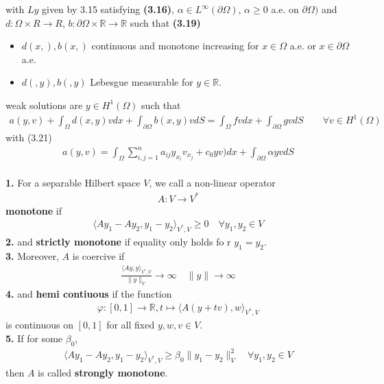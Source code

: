 \documentclass[a4paper,11pt,fleqn]{book}
\theoremstyle{definition}
\theoremstyle{remark}
\begin{document}
with $Ly$ given by 3.15 satisfying\textbf{ (3.16)}, $\alpha \in L^\infty(\partial \Omega)$, $\alpha \geq 0$ a.e. on $\partial \Omega)$ and $d: \Omega \times R \rightarrow R$, $b: \partial \Omega \times \mathbb{R} \rightarrow \mathbb{R}$ such that \textbf{(3.19)}
\begin{itemize}
	\item $d(x, ), b(x, )$ continuous and monotone increasing for $x \in \Omega$ a.e. or $x \in \partial \Omega$ a.e. 
	\item $d(, y), b(,y )$ Lebesgue measurable for $y \in \mathbb{R}$. 
\end{itemize}
weak solutions are $y \in H^1(\Omega)$ such that
\begin{align*}
	a(y, v) + \int_\Omega d(x, y) v dx + \int_{\partial \Omega} b(x, y) v dS 
	= \int_\Omega fv dx + \int_{\partial \Omega} gv dS \qquad \forall v \in H^1(\Omega)
\end{align*}
with (3.21)
\begin{align*}
	a(y, v) = \int_{\Omega} \sum_{i, j = 1}^n a_{ij} y_{x_i} v_{x_j} + c_0yv)dx + \int_{\partial \Omega} \alpha y v dS
\end{align*}
\qquad\\
\textbf{1.} For a separable Hilbert space $V$, we call a non-linear operator
\begin{align*}
	A: V \rightarrow V^*
\end{align*}
\textbf{monotone} if 
\begin{align*}
	\langle Ay_1 - Ay_2, y_1 - y_2 \rangle_{V^*, V} \ge 0 \quad \forall y_1, y_2 \in V
\end{align*}
\textbf{2.} and \textbf{strictly monotone} if equality only holds fo r $y_1 = y_2$. \\
\textbf{3. }Moreover, $A$ is coercive if 
\begin{align*}
	\frac{\langle Ay, y \rangle_{V^*, V}}{\|y\|_V} \rightarrow \infty \quad \|y\| \rightarrow \infty
\end{align*}
\textbf{4.} and \textbf{hemi contiuous} if the function
\begin{align*}
	\varphi:[0, 1] \rightarrow \mathbb{R}, t \mapsto \langle A(y + tv), w \rangle_{V^*, V}
\end{align*}
is continuous on $[0, 1]$ for all fixed $y, w, v \in V$. \\
\textbf{5.} If for some $\beta_0$, 
\begin{align*}
	\langle Ay_1 - Ay_2, y_1 - y_2 \rangle_{V^*, V} \geq \beta_0\|y_1 - y_2\|_V^2 \quad \forall y_1, y_2 \in V
\end{align*}
then $A$ is called \textbf{strongly monotone}. 
\end{document}
